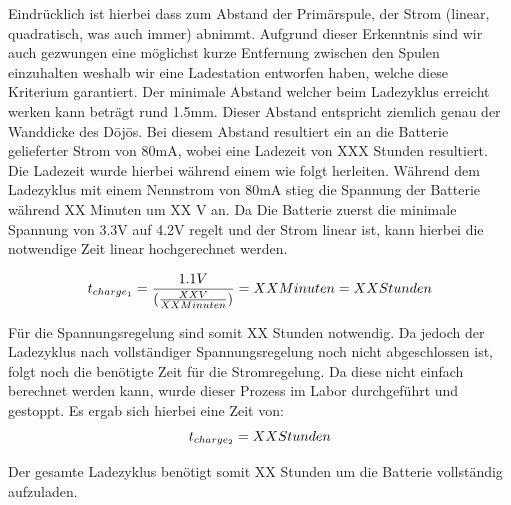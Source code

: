 Eindrücklich ist hierbei dass zum Abstand der Primärspule, der Strom (linear, quadratisch, was auch immer) abnimmt. Aufgrund dieser Erkenntnis sind wir auch gezwungen eine möglichst kurze Entfernung zwischen den Spulen einzuhalten weshalb wir eine Ladestation entworfen haben, welche diese Kriterium garantiert. Der minimale Abstand welcher beim Ladezyklus erreicht werken kann beträgt rund 1.5mm. Dieser Abstand entspricht ziemlich genau der Wanddicke des Dōjōs. Bei diesem Abstand resultiert ein an die Batterie gelieferter Strom von 80mA, wobei eine Ladezeit von XXX Stunden resultiert. Die Ladezeit wurde hierbei während einem wie folgt herleiten. Während dem Ladezyklus mit einem Nennstrom von 80mA stieg die Spannung der Batterie während XX Minuten um XX V an. Da Die Batterie zuerst die minimale Spannung von 3.3V auf 4.2V regelt und der Strom linear ist, kann hierbei die notwendige Zeit linear hochgerechnet werden. 

\begin{equation}
\centering
t_{charge_{1}}=\frac{1.1 V}{(\frac{XX V}{XX Minuten})}=XX Minuten= XX Stunden
\label{eq:LadezeitSpannungsregelung}
\end{equation}

Für die Spannungsregelung sind somit XX Stunden notwendig. Da jedoch der Ladezyklus nach vollständiger Spannungsregelung noch nicht abgeschlossen ist, folgt noch die benötigte Zeit für die Stromregelung. Da diese nicht einfach berechnet werden kann, wurde dieser Prozess im Labor durchgeführt und gestoppt. Es ergab sich hierbei eine Zeit von:
\begin{equation}
\centering
t_{charge_{2}}= XX Stunden
\label{eq:LadezeitStromregelung}
\end{equation}

Der gesamte Ladezyklus benötigt somit XX Stunden um die Batterie vollständig aufzuladen.  
